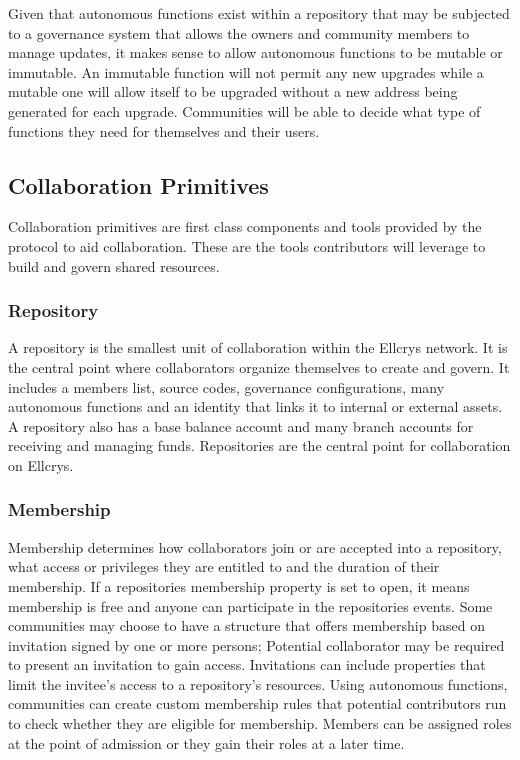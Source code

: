 Given that autonomous functions exist within a repository that may be subjected to a governance system that allows the owners and community members to manage updates, it makes sense to allow autonomous functions to be mutable or immutable. An immutable function will not permit any new upgrades while a mutable one will allow itself to be upgraded without a new address being generated for each upgrade. Communities will be able to decide what type of functions they need for themselves and their users.


\subsection{Collaboration Primitives}
Collaboration primitives are first class components and tools provided by the protocol to aid collaboration. These are the tools contributors will leverage to build and govern shared resources.

\subsubsection{Repository}
A repository is the smallest unit of collaboration within the Ellcrys network. It is the central point where collaborators organize themselves to create and govern. It includes a members list, source codes, governance configurations, many autonomous functions and an identity that links it to internal or external assets. A repository also has a base balance account and many branch accounts for receiving and managing funds. Repositories are the central point for collaboration on Ellcrys.

\subsubsection{Membership}
Membership determines how collaborators join or are accepted into a repository, what access or privileges they are entitled to and the duration of their membership. If a repositories membership property is set to open, it means membership is free and anyone can participate in the repositories events. Some communities may choose to have a structure that offers membership based on invitation signed by one or more persons; Potential collaborator may be required to present an invitation to gain access. Invitations can include properties that limit the invitee's access to a repository’s resources. Using autonomous functions, communities can create custom membership rules that potential contributors run to check whether they are eligible for membership. Members can be assigned roles at the point of admission or they gain their roles at a later time.


